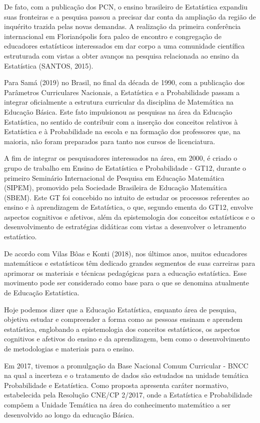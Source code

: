 De fato, com a publicação dos PCN, o ensino brasileiro de Estatística expandiu suas fronteiras e a pesquisa passou a precisar dar conta da ampliação da região de inquérito trazida pelas novas demandas. A realização da primeira conferência internacional em Florianópolis fora palco de encontro e congregação de educadores estatísticos interessados em dar corpo a uma comunidade científica estruturada com vistas a obter avanços na pesquisa relacionada ao ensino da Estatística (SANTOS, 2015).
\vskip0.3cm

Para Samá (2019) no Brasil, no final da década de 1990, com a publicação dos Parâmetros Curriculares Nacionais, a Estatística e a Probabilidade passam a integrar oficialmente a estrutura curricular da disciplina de Matemática na Educação Básica. Este fato impulsionou as pesquisas na área da Educação Estatística, no sentido de contribuir com a inserção dos conceitos relativos à Estatística e à Probabilidade na escola e na formação dos professores que, na maioria, não foram preparados para tanto nos cursos de licenciatura. 
\vskip0.3cm

A fim de integrar os pesquisadores interessados na área, em 2000, é criado o grupo de trabalho em Ensino de Estatística e Probabilidade - GT12, durante o primeiro Seminário Internacional de Pesquisa em Educação Matemática (SIPEM), promovido pela Sociedade Brasileira de Educação Matemática (SBEM). Este GT foi concebido no intuito de estudar os processos referentes ao ensino e à aprendizagem de Estatística, o que, segundo ementa do GT12, envolve aspectos cognitivos e afetivos, além da epistemologia dos conceitos estatísticos e o desenvolvimento de estratégias didáticas com vistas a desenvolver o letramento estatístico.\vskip0.3cm


De acordo com Vilas Bôas e Konti (2018), nos últimos anos, muitos educadores matemáticos e estatísticos têm dedicado grandes segmentos de suas carreiras para aprimorar os materiais e técnicas pedagógicas para a educação estatística. Esse movimento pode ser considerado como base para o que se denomina atualmente de Educação Estatística.

\newpage
Hoje podemos dizer que a Educação Estatística, enquanto área de pesquisa, objetiva estudar e compreender a forma como as pessoas ensinam e aprendem estatística, englobando a epistemologia dos conceitos estatísticos, os aspectos cognitivos e afetivos do ensino e da aprendizagem, bem como o desenvolvimento de metodologias e materiais para o ensino. \vskip0.3cm


Em 2017, tivemos a promulgação da Base Nacional Comum Curricular - BNCC na qual a incerteza e o tratamento de dados são estudados na unidade temática Probabilidade e Estatística. Como proposta apresenta caráter normativo, estabelecida pela Resolução CNE/CP 2/2017, onde a Estatística e Probabilidade compõem a Unidade Temática na área do conhecimento matemático a ser desenvolvido ao longo da educação Básica. \vskip0.3cm


